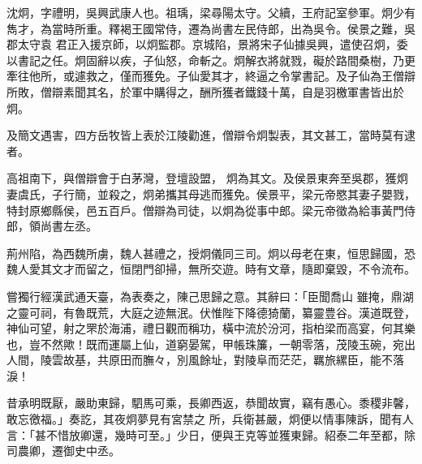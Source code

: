 
\begin{pinyinscope}

 沈炯，字禮明，吳興武康人也。祖瑀，梁尋陽太守。父續，王府記室參軍。炯少有雋才，為當時所重。釋褐王國常侍，遷為尚書左民侍郎，出為吳令。侯景之難，吳郡太守袁
 君正入援京師，以炯監郡。京城陷，景將宋子仙據吳興，遣使召炯，委以書記之任。炯固辭以疾，子仙怒，命斬之。炯解衣將就戮，礙於路間桑樹，乃更牽往他所，或遽救之，僅而獲免。子仙愛其才，終逼之令掌書記。及子仙為王僧辯所敗，僧辯素聞其名，於軍中購得之，酬所獲者鐵錢十萬，自是羽檄軍書皆出於炯。



 及簡文遇害，四方岳牧皆上表於江陵勸進，僧辯令炯製表，其文甚工，當時莫有逮者。



 高祖南下，與僧辯會于白茅灣，登壇設盟，
 炯為其文。及侯景東奔至吳郡，獲炯妻虞氏，子行簡，並殺之，炯弟攜其母逃而獲免。侯景平，梁元帝愍其妻子嬰戮，特封原鄉縣侯，邑五百戶。僧辯為司徒，以炯為從事中郎。梁元帝徵為給事黃門侍郎，領尚書左丞。



 荊州陷，為西魏所虜，魏人甚禮之，授炯儀同三司。炯以母老在東，恒思歸國，恐魏人愛其文才而留之，恒閉門卻掃，無所交遊。時有文章，隨即棄毀，不令流布。



 嘗獨行經漢武通天臺，為表奏之，陳己思歸之意。其辭曰：「臣聞喬山
 雖掩，鼎湖之靈可祠，有魯既荒，大庭之迹無泯。伏惟陛下降德猗蘭，纂靈豊谷。漢道既登，神仙可望，射之罘於海浦，禮日觀而稱功，橫中流於汾河，指柏梁而高宴，何其樂也，豈不然歟！既而運屬上仙，道窮晏駕，甲帳珠簾，一朝零落，茂陵玉碗，宛出人間，陵雲故基，共原田而膴々，別風餘址，對陵阜而茫茫，羈旅縲臣，能不落淚！



 昔承明既厭，嚴助東歸，駟馬可乘，長卿西返，恭聞故實，竊有愚心。黍稷非馨，敢忘徼福。」奏訖，其夜炯夢見有宮禁之
 所，兵衛甚嚴，炯便以情事陳訴，聞有人言：「甚不惜放卿還，幾時可至。」少日，便與王克等並獲東歸。紹泰二年至都，除司農卿，遷御史中丞。




\end{pinyinscope}
